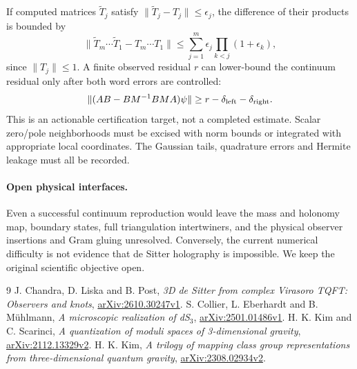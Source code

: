 \documentclass[11pt,a4paper]{article}
\begin{document}
If computed matrices $\widetilde T_j$ satisfy
$\|\widetilde T_j-T_j\|\leq\epsilon_j$, the difference of their
products is bounded by
\begin{equation}
 \|\widetilde T_m\cdots\widetilde T_1-T_m\cdots T_1\|
 \leq\sum_{j=1}^m\epsilon_j\prod_{k<j}(1+\epsilon_k),
\end{equation}
since $\|T_j\|\leq1$. A finite observed residual $r$ can lower-bound
the continuum residual only after both word errors are controlled:
\begin{equation}
 \|(AB-BM^{-1}BMA)\psi\|\geq r-\delta_{\rm left}-\delta_{\rm right}.
\end{equation}
This is an actionable certification target, not a completed estimate.
Scalar zero/pole neighborhoods must be excised with norm bounds or
integrated with appropriate local coordinates. The Gaussian tails,
quadrature errors and Hermite leakage must all be recorded.

\paragraph{Open physical interfaces.}
Even a successful continuum reproduction would leave the mass and holonomy
map, boundary states, full triangulation intertwiners, and the physical
observer insertions and Gram gluing unresolved. Conversely, the current
numerical difficulty is not evidence that de Sitter holography is
impossible. We keep the original scientific objective open.

\begin{thebibliography}{9}\small
{} J. Chandra, D. Liska and B. Post,
\emph{3D de Sitter from complex Virasoro TQFT: Observers and knots},
\href{https://arxiv.org/abs/2610.30247v1}{arXiv:2610.30247v1}.
 S. Collier, L. Eberhardt and B. M\"uhlmann,
\emph{A microscopic realization of dS$_3$},
\href{https://arxiv.org/abs/2501.01486v1}{arXiv:2501.01486v1}.
 H. K. Kim and C. Scarinci,
\emph{A quantization of moduli spaces of 3-dimensional gravity},
\href{https://arxiv.org/abs/2112.13329v2}{arXiv:2112.13329v2}.
 H. K. Kim,
\emph{A trilogy of mapping class group representations from
three-dimensional quantum gravity},
\href{https://arxiv.org/abs/2308.02934v2}{arXiv:2308.02934v2}.
\end{thebibliography}
\end{document}
